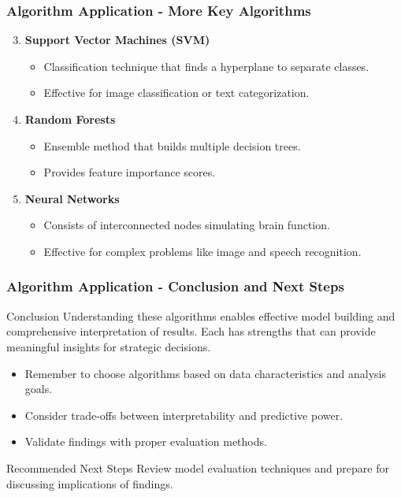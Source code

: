 \documentclass{beamer}
\begin{document}
\begin{frame}[fragile]
    \frametitle{Algorithm Application - More Key Algorithms}
    \begin{enumerate}
        \setcounter{enumi}{2}
        \item \textbf{Support Vector Machines (SVM)}
            \begin{itemize}
                \item Classification technique that finds a hyperplane to separate classes.
                \item Effective for image classification or text categorization.
            \end{itemize}
        \item \textbf{Random Forests}
            \begin{itemize}
                \item Ensemble method that builds multiple decision trees.
                \item Provides feature importance scores.
            \end{itemize}
        \item \textbf{Neural Networks}
            \begin{itemize}
                \item Consists of interconnected nodes simulating brain function.
                \item Effective for complex problems like image and speech recognition.
            \end{itemize}
    \end{enumerate}
\end{frame}

\begin{frame}[fragile]
    \frametitle{Algorithm Application - Conclusion and Next Steps}
    \begin{block}{Conclusion}
        Understanding these algorithms enables effective model building and comprehensive interpretation of results. Each has strengths that can provide meaningful insights for strategic decisions.
    \end{block}
    \begin{itemize}
        \item Remember to choose algorithms based on data characteristics and analysis goals.
        \item Consider trade-offs between interpretability and predictive power.
        \item Validate findings with proper evaluation methods.
    \end{itemize}
    \begin{block}{Recommended Next Steps}
        Review model evaluation techniques and prepare for discussing implications of findings.
    \end{block}
\end{frame}
\end{document}
